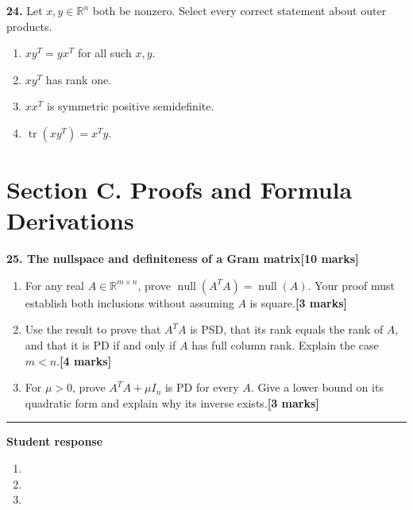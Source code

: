 \documentclass[11pt,a4paper]{article}
\newlength{\BlankAnswerHeight}\setlength{\BlankAnswerHeight}{16mm}
\newcommand{\AnswerBlank}{\leavevmode\par\vspace{\BlankAnswerHeight}}
\begin{document}
\par\noindent\begin{minipage}{\linewidth}
\textbf{24.} Let \(x,y\in\mathbb R^n\) both be nonzero. Select every correct statement about outer products.
\begin{enumerate}[label=(\Alph*),leftmargin=8mm,itemsep=2pt,topsep=2pt]
\item \(xy^T=yx^T\) for all such \(x,y\).
\item \(xy^T\) has rank one.
\item \(xx^T\) is symmetric positive semidefinite.
\item \(\operatorname{tr}(xy^T)=x^Ty\).
\end{enumerate}

\end{minipage}\par\vspace{3mm}
\newpage\section*{Section C. Proofs and Formula Derivations}
\textbf{25. The nullspace and definiteness of a Gram matrix}\hfill\textbf{[10 marks]}\par\medskip
\begin{enumerate}[label=(\alph*),leftmargin=8mm,itemsep=3pt]
\item For any real \(A\in\mathbb R^{m\times n}\), prove \(\operatorname{null}(A^TA)=\operatorname{null}(A)\). Your proof must establish both inclusions without assuming \(A\) is square.\hfill\textbf{[3 marks]}
\item Use the result to prove that \(A^TA\) is PSD, that its rank equals the rank of \(A\), and that it is PD if and only if \(A\) has full column rank. Explain the case \(m<n\).\hfill\textbf{[4 marks]}
\item For \(\mu>0\), prove \(A^TA+\mu I_n\) is PD for every \(A\). Give a lower bound on its quadratic form and explain why its inverse exists.\hfill\textbf{[3 marks]}
\end{enumerate}\par\medskip\hrule\medskip\textbf{Student response}\par
\begin{enumerate}[label=(\alph*),leftmargin=8mm,itemsep=3pt]
\item
\AnswerBlank
\item
\AnswerBlank
\item
\AnswerBlank
\end{enumerate}
\end{document}
